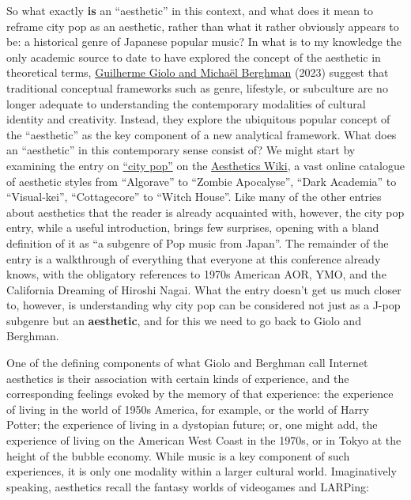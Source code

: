 \documentclass[
  letterpaper,
  DIV=11,
  numbers=noendperiod,
  oneside]{scrartcl}
\begin{document}
So what exactly \textbf{is} an ``aesthetic'' in this context, and what
does it mean to reframe city pop as an aesthetic, rather than what it
rather obviously appears to be: a historical genre of Japanese popular
music? In what is to my knowledge the only academic source to date to
have explored the concept of the aesthetic in theoretical terms,
\href{https://firstmonday.org/ojs/index.php/fm/article/view/12723}{Guilherme
Giolo and Michaël Berghman} (2023) suggest that traditional conceptual
frameworks such as genre, lifestyle, or subculture are no longer
adequate to understanding the contemporary modalities of cultural
identity and creativity. Instead, they explore the ubiquitous popular
concept of the ``aesthetic'' as the key component of a new analytical
framework. What does an ``aesthetic'' in this contemporary sense consist
of? We might start by examining the entry on
\href{https://aesthetics.fandom.com/wiki/City_Pop}{``city pop''} on the
\href{https://aesthetics.fandom.com/wiki/Aesthetics_Wiki}{Aesthetics
Wiki}, a vast online catalogue of aesthetic styles from ``Algorave'' to
``Zombie Apocalyse'', ``Dark Academia'' to ``Visual-kei'',
``Cottagecore'' to ``Witch House''. Like many of the other entries about
aesthetics that the reader is already acquainted with, however, the city
pop entry, while a useful introduction, brings few surprises, opening
with a bland definition of it as ``a subgenre of Pop music from Japan''.
The remainder of the entry is a walkthrough of everything that everyone
at this conference already knows, with the obligatory references to
1970s American AOR, YMO, and the California Dreaming of Hiroshi Nagai.
What the entry doesn't get us much closer to, however, is understanding
why city pop can be considered not just as a J-pop subgenre but an
\textbf{aesthetic}, and for this we need to go back to Giolo and
Berghman.

One of the defining components of what Giolo and Berghman call Internet
aesthetics is their association with certain kinds of experience, and
the corresponding feelings evoked by the memory of that experience: the
experience of living in the world of 1950s America, for example, or the
world of Harry Potter; the experience of living in a dystopian future;
or, one might add, the experience of living on the American West Coast
in the 1970s, or in Tokyo at the height of the bubble economy. While
music is a key component of such experiences, it is only one modality
within a larger cultural world. Imaginatively speaking, aesthetics
recall the fantasy worlds of videogames and LARPing:
\end{document}
